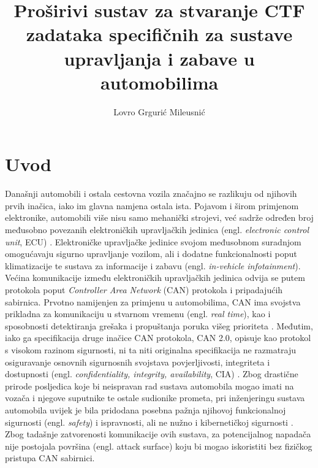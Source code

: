 \documentclass[times, utf8, diplomski, numeric]{fer}
\begin{document}

\title{Proširivi sustav za stvaranje CTF zadataka specifičnih za sustave upravljanja i
zabave u automobilima}

\author{Lovro Grgurić Mileusnić}

\maketitle

\izvornik

\zahvala{}

\tableofcontents

\chapter{Uvod}
Današnji automobili i ostala cestovna vozila značajno se razlikuju od njihovih prvih inačica, iako im glavna namjena ostala ista. Pojavom i širom primjenom elektronike, automobili više nisu samo mehanički strojevi, već sadrže određen broj međusobno povezanih elektroničkih upravljačkih jedinica (engl. \textit{electronic control unit}, ECU) \cite{koscher2010}. Elektroničke upravljačke jedinice svojom međusobnom suradnjom omogućavaju sigurno upravljanje vozilom, ali i dodatne funkcionalnosti poput klimatizacije te sustava za informacije i zabavu (engl. \textit{in-vehicle infotainment}). Većina komunikacije između elektroničkih upravljačkih jedinica odvija se putem protokola poput \textit{Controller Area Network} (CAN) protokola i pripadajućih sabirnica. Prvotno namijenjen za primjenu u automobilima, CAN ima svojstva prikladna za komunikaciju u stvarnom vremenu (engl. \textit{real time}), kao i sposobnosti detektiranja grešaka i propuštanja poruka višeg prioriteta \cite{canopen1}. Međutim, iako ga specifikacija druge inačice CAN protokola, CAN 2.0, opisuje kao protokol s visokom razinom sigurnosti, ni ta niti originalna specifikacija ne razmatraju osiguravanje osnovnih sigurnosnih svojstava povjerljivosti, integriteta i dostupnosti (engl. \textit{confidentiality, integrity, availability}, CIA) \cite{bosch1991, canislabs1}. Zbog drastične prirode posljedica koje bi neispravan rad sustava automobila mogao imati na vozača i njegove suputnike te ostale sudionike prometa, pri inženjeringu sustava automobila uvijek je bila pridodana posebna pažnja njihovoj funkcionalnoj sigurnosti (engl. \textit{safety}) i ispravnosti, ali ne nužno i kibernetičkoj sigurnosti \cite{koscher2010}. Zbog tadašnje zatvorenosti komunikacije ovih sustava, za potencijalnog napadača nije postojala površina (engl. attack surface) koju bi mogao iskoristiti bez fizičkog pristupa CAN sabirnici.
\end{document}
